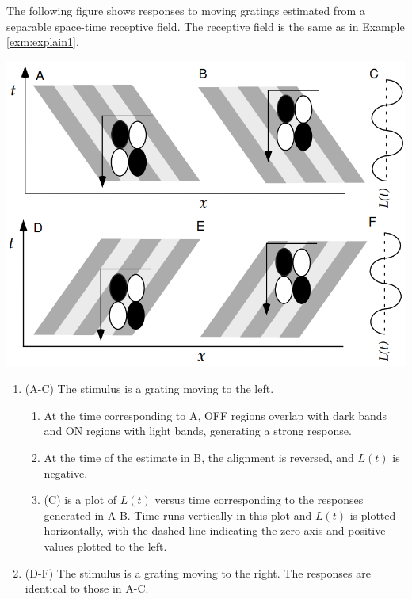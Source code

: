 \begin{exm}
  \label{exm:explain2}
  The following figure shows responses to moving gratings estimated from a separable space-time receptive field. The receptive field is the same as in Example \ref{exm:explain1}.
  \begin{center}
    \includegraphics[scale=0.27]{./png/responseSelectivityExplain2}
  \end{center}
  \begin{enumerate}[]
  \item (A-C) The stimulus is a grating moving to the left.
    \begin{enumerate}[-]
    \item At the time corresponding to A, OFF regions overlap with dark bands and ON regions with light bands, generating a strong response.
    \item At the time of the estimate in B, the alignment is reversed, and $L(t)$ is negative.
    \item (C) is a plot of $L(t)$ versus time corresponding to the responses generated in A-B. Time runs vertically in this plot and $L(t)$ is plotted horizontally, with the dashed line indicating the zero axis and positive values plotted to the left.
    \end{enumerate}
  \item (D-F) The stimulus is a grating moving to the right. The responses are identical to those in A-C.
  \end{enumerate}
\end{exm}


